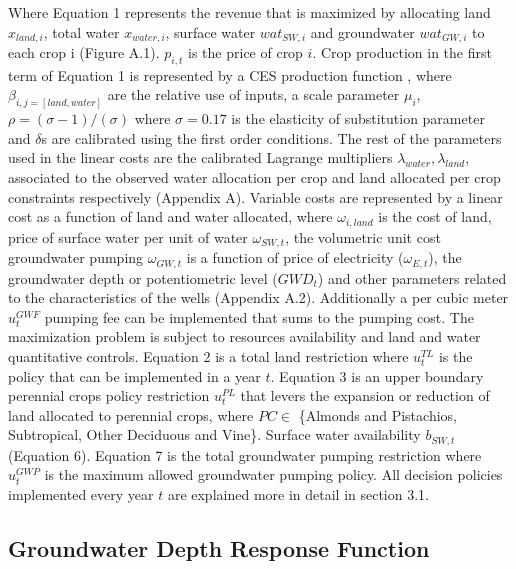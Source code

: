 \documentclass[11pt,a4paper]{article}
\begin{document}
Where Equation 1 represents the revenue that is maximized by allocating land $x_{land,i}$, total water $x_{water,i}$, surface water $wat_{SW,i}$ and groundwater $wat_{GW,i}$ to each crop i (Figure A.1). $p_{i,t}$ is the price of crop $i$. Crop production in the first term of Equation 1 is represented by a CES production function \cite{deber}, where $\beta_{i,j=[land,water]}$ are the relative use of inputs, a scale parameter $\mu_{i}$, $\rho = (\sigma-1)/(\sigma)$ where $\sigma = 0.17$ is the elasticity of substitution parameter and $\delta$s are calibrated using the first order conditions. The rest of the parameters used in the linear costs are the calibrated Lagrange multipliers $\lambda_{water},\lambda_{land}$, associated to the observed water allocation per crop and land allocated per crop constraints respectively (Appendix A). Variable costs are represented by a linear cost as a function of land and water allocated, where $\omega_{i,land}$ is the cost of land, price of surface water per unit of water $\omega_{SW,t}$, the volumetric unit cost groundwater pumping $\omega_{GW,t}$ is a function of price of electricity ($\omega_{E,t}$), the groundwater depth or potentiometric level ($GWD_t$) and other parameters related to the characteristics of the wells (Appendix A.2). Additionally a per cubic meter $u^{GWF}_{t}$ pumping fee can be implemented that sums to the pumping cost. The maximization problem is subject to resources availability and land and water quantitative controls. Equation 2 is a total land restriction where $u^{TL}_{t}$ is the policy that can be implemented in a year $t$. Equation 3 is an upper boundary perennial crops policy restriction $u^{PL}_{t}$ that levers the expansion or reduction of land allocated to perennial crops, where $PC \in$ \{Almonds and Pistachios, Subtropical, Other Deciduous and Vine\}. Surface water availability $b_{SW,t}$ (Equation 6). Equation 7 is the total groundwater pumping restriction where $u^{GWP}_{t}$ is the maximum allowed groundwater pumping policy.  All decision policies implemented every year $t$ are explained more in detail in section 3.1.

\subsection{Groundwater Depth Response Function}
\end{document}
